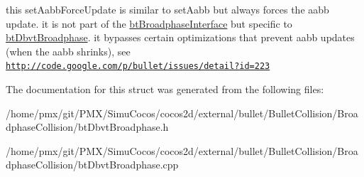 this set\+Aabb\+Force\+Update is similar to set\+Aabb but always forces the aabb update. it is not part of the \hyperlink{classbtBroadphaseInterface}{bt\+Broadphase\+Interface} but specific to \hyperlink{structbtDbvtBroadphase}{bt\+Dbvt\+Broadphase}. it bypasses certain optimizations that prevent aabb updates (when the aabb shrinks), see \href{http://code.google.com/p/bullet/issues/detail?id=223}{\tt http\+://code.\+google.\+com/p/bullet/issues/detail?id=223} 

The documentation for this struct was generated from the following files\+:\begin{DoxyCompactItemize}
\item 
/home/pmx/git/\+P\+M\+X/\+Simu\+Cocos/cocos2d/external/bullet/\+Bullet\+Collision/\+Broadphase\+Collision/bt\+Dbvt\+Broadphase.\+h\item 
/home/pmx/git/\+P\+M\+X/\+Simu\+Cocos/cocos2d/external/bullet/\+Bullet\+Collision/\+Broadphase\+Collision/bt\+Dbvt\+Broadphase.\+cpp\end{DoxyCompactItemize}
